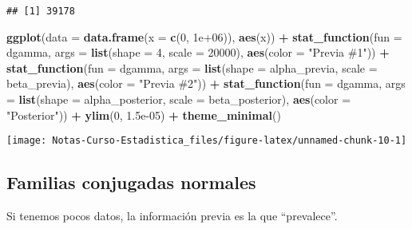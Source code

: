 \documentclass[
  12pt,
]{book}
\newenvironment{Shaded}{\begin{snugshade}}{\end{snugshade}}
\newcommand{\DataTypeTok}[1]{\textcolor[rgb]{0.13,0.29,0.53}{#1}}
\newcommand{\DecValTok}[1]{\textcolor[rgb]{0.00,0.00,0.81}{#1}}
\newcommand{\FloatTok}[1]{\textcolor[rgb]{0.00,0.00,0.81}{#1}}
\newcommand{\KeywordTok}[1]{\textcolor[rgb]{0.13,0.29,0.53}{\textbf{#1}}}
\newcommand{\NormalTok}[1]{#1}
\newcommand{\OperatorTok}[1]{\textcolor[rgb]{0.81,0.36,0.00}{\textbf{#1}}}
\newcommand{\StringTok}[1]{\textcolor[rgb]{0.31,0.60,0.02}{#1}}
\begin{document}
\begin{verbatim}
## [1] 39178
\end{verbatim}

\begin{Shaded}
\begin{Highlighting}[]
\KeywordTok{ggplot}\NormalTok{(}\DataTypeTok{data =} \KeywordTok{data.frame}\NormalTok{(}\DataTypeTok{x =} \KeywordTok{c}\NormalTok{(}\DecValTok{0}\NormalTok{, }\FloatTok{1e+06}\NormalTok{)), }\KeywordTok{aes}\NormalTok{(x)) }\OperatorTok{+}\StringTok{ }
\StringTok{    }\KeywordTok{stat\_function}\NormalTok{(}\DataTypeTok{fun =}\NormalTok{ dgamma, }\DataTypeTok{args =} \KeywordTok{list}\NormalTok{(}\DataTypeTok{shape =} \DecValTok{4}\NormalTok{, }
        \DataTypeTok{scale =} \DecValTok{20000}\NormalTok{), }\KeywordTok{aes}\NormalTok{(}\DataTypeTok{color =} \StringTok{"Previa \#1"}\NormalTok{)) }\OperatorTok{+}\StringTok{ }
\StringTok{    }\KeywordTok{stat\_function}\NormalTok{(}\DataTypeTok{fun =}\NormalTok{ dgamma, }\DataTypeTok{args =} \KeywordTok{list}\NormalTok{(}\DataTypeTok{shape =}\NormalTok{ alpha\_previa, }
        \DataTypeTok{scale =}\NormalTok{ beta\_previa), }\KeywordTok{aes}\NormalTok{(}\DataTypeTok{color =} \StringTok{"Previa \#2"}\NormalTok{)) }\OperatorTok{+}\StringTok{ }
\StringTok{    }\KeywordTok{stat\_function}\NormalTok{(}\DataTypeTok{fun =}\NormalTok{ dgamma, }\DataTypeTok{args =} \KeywordTok{list}\NormalTok{(}\DataTypeTok{shape =}\NormalTok{ alpha\_posterior, }
        \DataTypeTok{scale =}\NormalTok{ beta\_posterior), }\KeywordTok{aes}\NormalTok{(}\DataTypeTok{color =} \StringTok{"Posterior"}\NormalTok{)) }\OperatorTok{+}\StringTok{ }
\StringTok{    }\KeywordTok{ylim}\NormalTok{(}\DecValTok{0}\NormalTok{, }\FloatTok{1.5e{-}05}\NormalTok{) }\OperatorTok{+}\StringTok{ }\KeywordTok{theme\_minimal}\NormalTok{()}
\end{Highlighting}
\end{Shaded}

\begin{center}\texttt{[image: Notas-Curso-Estadistica\_files/figure-latex/unnamed-chunk-10-1]} \end{center}

\hypertarget{familias-conjugadas-normales}{%
\subsection{Familias conjugadas normales}\label{familias-conjugadas-normales}}

Si tenemos pocos datos, la información previa es la que ``prevalece''.
\end{document}
